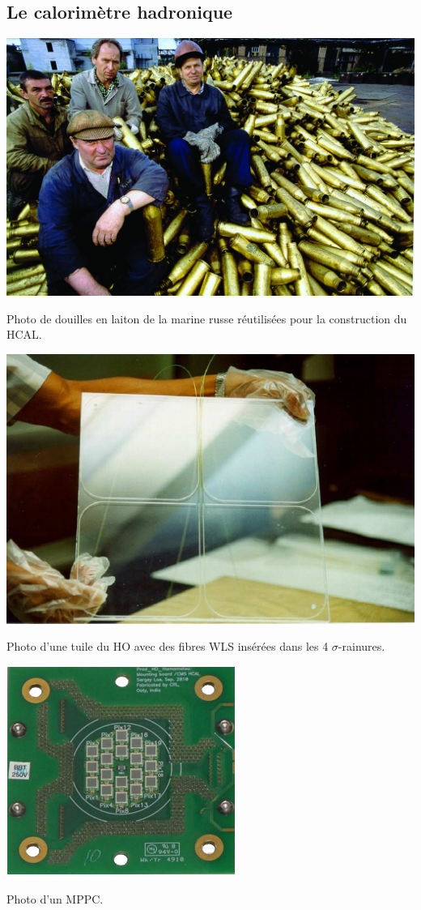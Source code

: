 \subsection{Le calorimètre hadronique}
	\marginpar
{
	\centering
	\includegraphics[width=\marginparwidth]{CMS/LAITON.jpg}
	\captionsetup{type=figure}\caption{Photo de douilles en laiton de la marine russe réutilisées pour la construction du HCAL.}
	\label{LAITON}
}
	\marginpar
{
	\centering
	\includegraphics[width=\marginparwidth]{CMS/SCINTI.png}
	\captionsetup{type=figure}\caption{Photo d'une tuile du HO avec des fibres WLS insérées dans les \num{4} $\sigma$-rainures.}
	\label{SCINTI}
}
\marginpar
{
	\centering
	\includegraphics[width=\marginparwidth]{CMS/MPPC.png}
	\captionsetup{type=figure}\caption{Photo d'un MPPC.}
	\label{MPPC}
}
